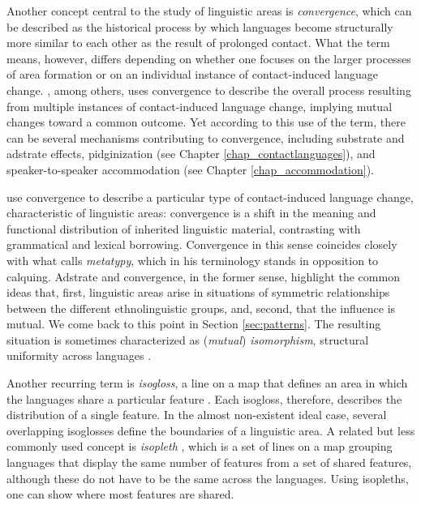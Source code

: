 \documentclass[output=paper]{langscibook}
\begin{document}
Another concept central to the study of linguistic areas is \textit{convergence}, which can be described as the historical process by which languages become structurally more similar to each other as the result of prolonged contact. What the term means, however, differs depending on whether one focuses on the larger processes of area formation or on an individual instance of contact-induced language change. \textcite{joseph2010}, among others, uses convergence to describe the overall process resulting from multiple instances of contact-induced language change, implying mutual changes toward a common outcome. Yet according to this use of the term, there can be several mechanisms contributing to convergence, including substrate and adstrate effects, pidginization (see Chapter \ref{chap_contactlanguages}), and speaker-to-speaker accommodation (see Chapter \ref{chap_accommodation}). 


\textcite{matras&sakel2007} use convergence to describe a particular type of contact-induced language change, characteristic of linguistic areas: convergence is a shift in the meaning and functional distribution of inherited linguistic material, contrasting with grammatical and lexical borrowing. Convergence in this sense coincides closely with what \textcite{ross2007} calls \textit{metatypy}, which in his terminology stands in opposition to calquing. Adstrate and convergence, in the former sense, highlight the common ideas that, first, linguistic areas arise in situations of symmetric relationships between the different ethnolinguistic groups, and, second, that the influence is mutual. We come back to this point in Section \ref{sec:patterns}. The resulting situation is sometimes characterized as (\textit{mutual}) \textit{isomorphism}, structural uniformity across languages \parencite[see][]{matras1998}.

Another recurring term is \textit{isogloss}, a line on a map that defines an area in which the languages share a particular feature \parencite[or, more rarely, in the case of exclusively structural features \textit{isogrammatism} is also used, see][]{gołąb1956}. Each isogloss, therefore, describes the distribution of a single feature. In the almost non-existent ideal  case, several overlapping isoglosses define the boundaries of a linguistic area. A related but less commonly used concept is \textit{isopleth} \parencite[see][]{auwera1998}, which is a set of lines on a map grouping languages that display the same number of features from a set of shared features, although these do not have to be the same across the languages. Using isopleths, one can show where most features are shared.
\end{document}
